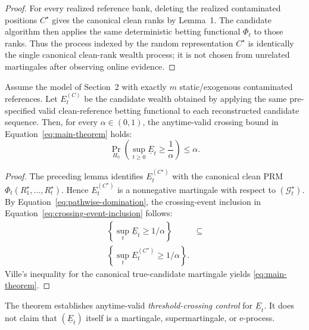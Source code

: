 \begin{proof}
For every realized reference bank, deleting the realized contaminated positions \(C^\star\) gives the canonical clean ranks by Lemma~1. The candidate algorithm then applies the same deterministic betting functional \(\Phi_t\) to those ranks. Thus the process indexed by the random representation \(C^\star\) is identically the single canonical clean-rank wealth process; it is not chosen from unrelated martingales after observing online evidence.
\end{proof}

\begin{theorem}
Assume the model of Section~2 with exactly \(m\) static/exogenous contaminated references. Let \(E_t^{(C)}\) be the candidate wealth obtained by applying the same pre-specified valid clean-reference betting functional to each reconstructed candidate sequence. Then, for every \(\alpha\in(0,1)\), the anytime-valid crossing bound in Equation~\eqref{eq:main-theorem} holds:
\begin{equation}
  \Pr_{H_0}\!\left(
    \sup_{t\ge0}\underline E_t\ge\frac1\alpha
  \right)
  \le \alpha.
  \label{eq:main-theorem}
\end{equation}
\end{theorem}

\begin{proof}
The preceding lemma identifies \(E_t^{(C^\star)}\) with the canonical clean PRM
\(\Phi_t(R_1^\star,\ldots,R_t^\star).\)
Hence \(E_t^{(C^\star)}\) is a nonnegative martingale with respect to \((\mathcal G_t^\star)\). By Equation~\eqref{eq:pathwise-domination}, the crossing-event inclusion in Equation~\eqref{eq:crossing-event-inclusion} follows:
\begin{equation}
\begin{aligned}
\left\{\sup_t\underline E_t\ge1/\alpha\right\}
&\subseteq\\
\left\{\sup_tE_t^{(C^\star)}\ge1/\alpha\right\}.
\end{aligned}
\label{eq:crossing-event-inclusion}
\end{equation}
Ville's inequality for the canonical true-candidate martingale yields \eqref{eq:main-theorem}.
\end{proof}

The theorem establishes anytime-valid \emph{threshold-crossing control} for \(\underline E_t\). It does not claim that \((\underline E_t)\) itself is a martingale, supermartingale, or e-process.

